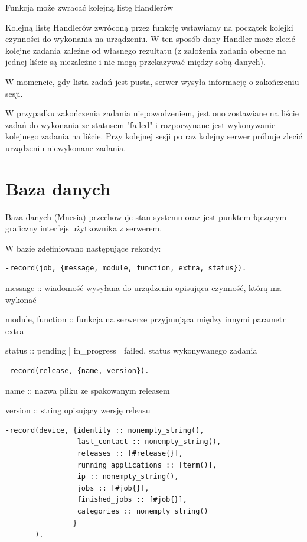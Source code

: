 \documentclass[polish,12pt]{aghthesis}
\begin{document}
Funkcja może zwracać kolejną listę Handlerów

Kolejną listę Handlerów zwróconą przez funkcję wstawiamy na początek kolejki czynności do wykonania na urządzeniu. W ten sposób dany Handler może zlecić kolejne zadania zależne od własnego rezultatu (z założenia zadania obecne na jednej liście są niezależne i nie mogą przekazywać między sobą danych).

W momencie, gdy lista zadań jest pusta, serwer wysyła informację o zakończeniu sesji.

W przypadku zakończenia zadania niepowodzeniem, jest ono zostawiane na liście zadań do wykonania ze statusem "failed" i rozpoczynane jest wykonywanie kolejnego zadania na liście. Przy kolejnej sesji po raz kolejny serwer próbuje zlecić urządzeniu niewykonane zadania.

\section{Baza danych}

Baza danych (Mnesia) przechowuje stan systemu oraz jest punktem łączącym graficzny interfejs użytkownika z serwerem.

W bazie zdefiniowano następujące rekordy:

\begin{verbatim}
-record(job, {message, module, function, extra, status}).
\end{verbatim}

message :: wiadomość wysyłana do urządzenia opisująca czynność, którą ma wykonać

module, function :: funkcja na serwerze przyjmująca między innymi parametr extra

status :: pending | in\_progress | failed, status wykonywanego zadania

\begin{verbatim}
-record(release, {name, version}).
\end{verbatim}

name :: nazwa pliku ze spakowanym releasem

version :: string opisujący wersję releasu

\begin{verbatim}
-record(device, {identity :: nonempty_string(),
                 last_contact :: nonempty_string(),
                 releases :: [#release{}],
                 running_applications :: [term()],
                 ip :: nonempty_string(),
                 jobs :: [#job{}],
                 finished_jobs :: [#job{}],
                 categories :: nonempty_string()
                }
       ).
\end{verbatim}
\end{document}
